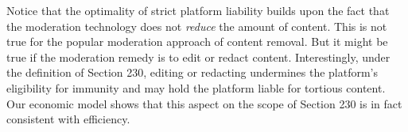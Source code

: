 Notice that the optimality of strict platform liability builds upon the fact that the moderation technology does not \emph{reduce} the amount of content. This is not true for the popular moderation approach of content removal. But it might be true if the moderation remedy is to edit or redact content. Interestingly, under the definition of Section 230, editing or redacting undermines the platform's eligibility for immunity and may hold the platform liable for tortious content. Our economic model shows that this aspect on the scope of Section 230 is in fact consistent with efficiency.